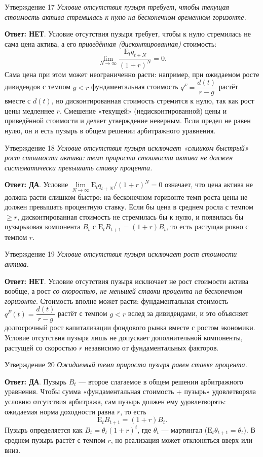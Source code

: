 \documentclass[10pt,a4paper]{article}
\newcommand{\qda}{\textbf{\color{yesgreen}Ответ: ДА}}
\newcommand{\qnet}{\textbf{\color{nored}Ответ: НЕТ}}
\newenvironment{answer}[2]{%
  \begin{qbox}{Утверждение #1}
  \textit{#2}\par\smallskip
}{%
  \end{qbox}\vspace{2pt}
}
\begin{document}
\begin{answer}{17}{Условие отсутствия пузыря требует, чтобы текущая стоимость актива стремилась к нулю на бесконечном временном горизонте.}
\qnet. Условие отсутствия пузыря требует, чтобы к нулю стремилась не сама цена актива, а его \emph{приведённая (дисконтированная)} стоимость:
\[
\lim_{N\to\infty}\dfrac{\mathrm{E}_tq_{t+N}}{(1+r)^N}=0.
\]
Сама цена при этом может неограниченно расти: например, при ожидаемом росте дивидендов с темпом $g<r$ фундаментальная стоимость $q^F=\dfrac{d(t)}{r-g}$ растёт вместе с $d(t)$, но дисконтированная стоимость стремится к нулю, так как рост цены медленнее $r$. Смешение «текущей» (недисконтированной) цены и приведённой стоимости и делает утверждение неверным. Если предел не равен нулю, он и есть пузырь в общем решении арбитражного уравнения.
\end{answer}

\begin{answer}{18}{Условие отсутствия пузыря исключает «слишком быстрый» рост стоимости актива: темп прироста стоимости актива не должен систематически превышать ставку процента.}
\qda. Условие $\lim\limits_{N\to\infty}\mathrm{E}_tq_{t+N}/(1+r)^N=0$ означает, что цена актива не должна расти слишком быстро: на бесконечном горизонте темп роста цены не должен превышать процентную ставку. Если бы цена в среднем росла с темпом $\geq r$, дисконтированная стоимость не стремилась бы к нулю, и появилась бы пузырьковая компонента $B_t$ с $\mathrm{E}_tB_{t+1}=(1+r)B_t$, то есть растущая ровно с темпом $r$.
\end{answer}

\begin{answer}{19}{Условие отсутствия пузыря исключает рост стоимости актива.}
\qnet. Условие отсутствия пузыря исключает не рост стоимости актива вообще, а рост \emph{со скоростью, не меньшей ставки процента на бесконечном горизонте}. Стоимость вполне может расти: фундаментальная стоимость $q^F(t)=\dfrac{d(t)}{r-g}$ растёт с темпом $g<r$ вслед за дивидендами, и это объясняет долгосрочный рост капитализации фондового рынка вместе с ростом экономики. Условие отсутствия пузыря лишь не допускает дополнительной компоненты, растущей со скоростью $r$ независимо от фундаментальных факторов.
\end{answer}

\begin{answer}{20}{Ожидаемый темп прироста пузыря равен ставке процента.}
\qda. Пузырь $B_t$ --- второе слагаемое в общем решении арбитражного уравнения. Чтобы сумма «фундаментальная стоимость + пузырь» удовлетворяла условию отсутствия арбитража, сам пузырь должен ему удовлетворять: ожидаемая норма доходности равна $r$, то есть
\[
\mathrm{E}_tB_{t+1}=(1+r)B_t.
\]
Пузырь определяется как $B_t=\theta_t(1+r)^t$, где $\theta_t$ --- мартингал ($\mathrm{E}_t\theta_{t+1}=\theta_t$). В среднем пузырь растёт с темпом $r$, но реализация может отклоняться вверх или вниз.
\end{answer}
\end{document}
